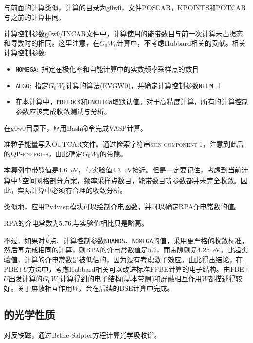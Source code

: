 与前面的计算类似，计算的目录为\textrm{g0w0}，文件\textrm{POSCAR}，\textrm{KPOINTS}和\textrm{POTCAR}与之前的计算相同。

计算控制参数\textrm{g0w0/INCAR}文件中，计算使用的能带数目与前一次计算未占据态和导数时的相同。这里注意，在$G_0W_0$计算中，不考虑\textrm{Hubbard}相关的贡献。相关计算控制参数:
\begin{itemize}
	\item \texttt{NOMEGA}:~指定在极化率和自能计算中的实数频率采样点的数目
	\item \texttt{ALGO}:~指定$G_0W_0$计算的算法\textrm{(EVGW0)}，并确定计算控制参数\texttt{NELM}=1
	\item 在本计算中，\texttt{PREFOCK}和\texttt{ENCUTGW}取默认值。对于高精度计算，所有的计算控制参数应该完成收敛测试与分析。
\end{itemize}
在\textrm{g0w0}目录下，应用\textrm{Bash}命令完成\textrm{VASP}计算。

准粒子能量写入\textrm{OUTCAR}文件。通过检索字符串\textsc{spin component 1}，注意到此后的\textsc{QP-energies}，由此确定$G_0W_0$的带隙。

本算例中带隙值是\textrm{4.6~eV}，与实验值\textrm{4.3~eV}接近。但是一定要记住，考虑到当前计算中$\vec k$空间网格剖分方案，频率采样点数目，能带数目等参数都并未完全收敛。因此，实际计算中必须有合理的收敛分析。

类似地，应用\textrm{Py4vasp}模块可以绘制介电函数，并可以确定\textrm{RPA}介电常数的值。

\textrm{RPA}的介电常数为5.76,与实验值相比只是略高。

不过，如果对$\vec k$点、计算控制参数\texttt{NBANDS}、\texttt{NOMEGA}的值，采用更严格的收敛标准，然后再完成相同的计算，则\textrm{RPA}的介电常数值是5.2，而带隙则是\textrm{4.25~eV}。比起实验值，计算的介电常数是被低估的，因为没有考虑激子效应。由此得出结论，在\textrm{PBE+}$U$方法中，考虑\textrm{Hubbard}相关可以改进标准F\textrm{PBE}计算的电子结构。由\textrm{PBE+}$U$出发计算的$G_0W_0$计算得到的电子结构(基本带隙)和屏蔽相互作用$W$都描述得较好。关于屏蔽相互作用$W$，会在后续的\textrm{BSE}计算中完成。

\subsection{的光学性质}
对反铁磁，通过\textrm{Bethe-Salpter}方程计算光学吸收谱。

